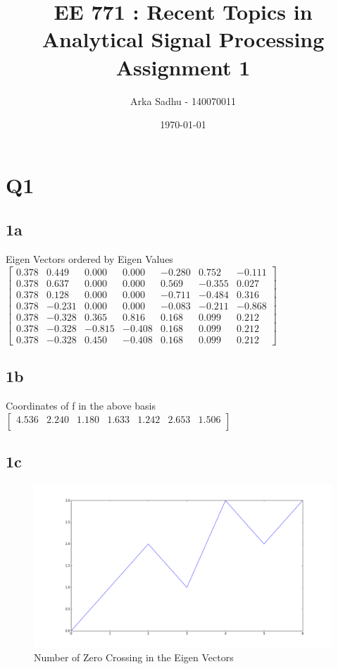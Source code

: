 \documentclass{article}
\title{EE 771 : Recent Topics in Analytical Signal Processing Assignment 1}
\author{Arka Sadhu - 140070011}
\date{\today}
\begin{document}
\maketitle

\section*{Q1}
\subsection*{1a}
Eigen Vectors ordered by Eigen Values \\
$
\begin{bmatrix}
  0.378 & 0.449 & 0.000 & 0.000 & -0.280 & 0.752 & -0.111 \\
  0.378 & 0.637 & 0.000 & 0.000 & 0.569 & -0.355 & 0.027 \\
  0.378 & 0.128 & 0.000 & 0.000 & -0.711 & -0.484 & 0.316 \\
  0.378 & -0.231 & 0.000 & 0.000 & -0.083 & -0.211 & -0.868 \\
  0.378 & -0.328 & 0.365 & 0.816 & 0.168 & 0.099 & 0.212 \\
  0.378 & -0.328 & -0.815 & -0.408 & 0.168 & 0.099 & 0.212 \\
  0.378 & -0.328 & 0.450 & -0.408 & 0.168 & 0.099 & 0.212
\end{bmatrix}
$
\subsection*{1b}
Coordinates of f in the above basis \\
$
\begin{bmatrix}
  4.536 & 2.240 & 1.180 & 1.633 & 1.242 & 2.653 & 1.506 \\
\end{bmatrix}
$
\subsection*{1c}

\begin{figure}[H]
  \centering
  \includegraphics[scale=0.25]{images/q1c_zero_cross}
  \caption{Number of Zero Crossing in the Eigen Vectors}
  \label{fig:q1c}
\end{figure}
\end{document}
